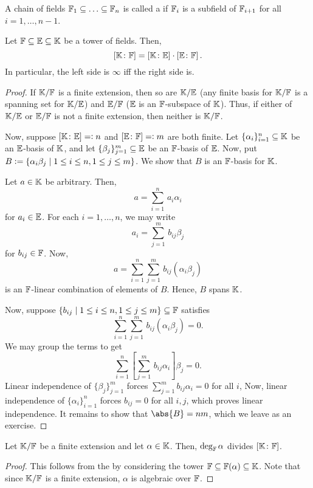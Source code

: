 \begin{defn}
    A chain of fields $\mathbb{F}_1 \subseteq \ldots \subseteq \mathbb{F}_n$ is called a  if $\mathbb{F}_i$ is a subfield of $\mathbb{F}_{i+1}$ for all $i=1,\ldots,n-1$.
\end{defn}
\begin{prop} \label{prop:tower}
    Let $\mathbb{F} \subseteq \mathbb{E} \subseteq \mathbb{K}$ be a tower of fields. Then, 
    \[
        \left[ \mathbb{K} \colon \mathbb{F} \right] = \left[ \mathbb{K} \colon \mathbb{E} \right] \cdot \left[ \mathbb{E} \colon \mathbb{F} \right].
    \]
    In particular, the left side is $\infty$ iff the right side is.
\end{prop}
\begin{proof}
    If $\mathbb{K}/\mathbb{F}$ is a finite extension, then so are $\mathbb{K}/\mathbb{E}$ (any finite basis for $\mathbb{K}/\mathbb{F}$ is a spanning set for $\mathbb{K}/\mathbb{E}$) and $\mathbb{E}/\mathbb{F}$ ($\mathbb{E}$ is an $\mathbb{F}$-subspace of $\mathbb{K}$). Thus, if either of $\mathbb{K}/\mathbb{E}$ or $\mathbb{E}/\mathbb{F}$ is not a finite extension, then neither is $\mathbb{K}/\mathbb{F}$. 
    
    Now, suppose $[\mathbb{K}\colon\mathbb{E}] =\vcentcolon n$ and $[\mathbb{E}\colon\mathbb{F}] =\vcentcolon m$ are both finite. Let $\{\alpha_i\}_{i=1}^n \subseteq \mathbb{K}$  be an $\mathbb{E}$-basis of $\mathbb{K}$, and let $\{\beta_j\}_{j=1}^m \subseteq \mathbb{E}$ be an $\mathbb{F}$-basis of $\mathbb{E}$. Now, put $B \vcentcolon= \left\{ \alpha_i \beta_j \mid 1 \leq i \leq n, 1 \leq j \leq m \right\}$. We show that $B$ is an $\mathbb{F}$-basis for $\mathbb{K}$. 
    
    Let $a \in \mathbb{K}$ be arbitrary. Then, 
    \[
        a = \sum_{i=1}^n \, a_i \alpha_i
    \]
    for $a_i \in \mathbb{E}$. For each $i =1, \ldots, n$, we may write
    \[
        a_i = \sum_{j=1}^m \, b_{ij} \beta_j
    \]
    for $b_{ij} \in \mathbb{F}$. Now, 
    \[
        a = \sum_{i=1}^n \sum_{j=1}^m \, b_{ij} (\alpha_i \beta_j)
    \]
    is an $\mathbb{F}$-linear combination of elements of $B$. Hence, $B$ spans $\mathbb{K}$.
    
    Now, suppose $\left\{ b_{ij} \mid 1 \leq i \leq n, 1 \leq j \leq m \right\} \subseteq \mathbb{F}$ satisfies 
    \[
        \sum_{i=1}^n \sum_{j=1}^m \, b_{ij} (\alpha_i \beta_j) = 0.
    \]
    We may group the terms to get
    \[
        \sum_{i=1}^n \left[ \sum_{j=1}^m \, b_{ij} \alpha_i \right] \beta_j = 0.
    \]
    Linear independence of $\{\beta_j\}_{j=1}^m$ forces $\sum_{j=1}^m b_{ij} \alpha_i = 0$ for all $i$, Now, linear independence of $\{\alpha_i\}_{i=1}^n$ forces $b_{ij} = 0$ for all $i,j$, which proves linear independence. It remains to show that $\abs{B} = nm$, which we leave as an exercise.
\end{proof}
\begin{cor}
Let $\mathbb{K}/\mathbb{F}$ be a finite extension and let $\alpha \in \mathbb{K}$. Then, $\deg_{\mathbb{F}} \alpha$ divides $[\mathbb{K} \colon \mathbb{F}]$.
\end{cor}
\begin{proof}
    This follows from the  by considering the tower $\mathbb{F} \subseteq \mathbb{F}(\alpha) \subseteq \mathbb{K}$. Note that since $\mathbb{K}/\mathbb{F}$ is a finite extension, $\alpha$ is algebraic over $\mathbb{F}$.
\end{proof}

